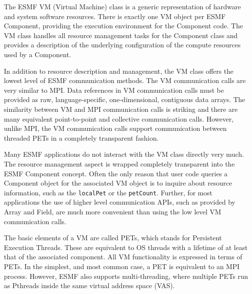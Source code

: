 %

The ESMF VM (Virtual Machine) class is a generic representation of hardware and system software resources. There is exactly one VM object per ESMF Component, providing the execution environment for the Component code. The VM class handles all resource management tasks for the Component class and provides a description of the underlying configuration of the compute resources used by a Component.

In addition to resource description and management, the VM class offers the lowest level of ESMF communication methods. The VM communication calls are very similar to MPI. Data references in VM communication calls must be provided as raw, language-specific, one-dimensional, contiguous data arrays. The similarity between VM and MPI communication calls is striking and there are many equivalent point-to-point and collective communication calls. However, unlike MPI, the VM communication calls support communication between threaded PETs in a completely transparent fashion.

Many ESMF applications do not interact with the VM class directly very much. The  resource management aspect is wrapped completely transparent into the ESMF Component concept. Often the only reason that user code queries a Component
object for the associated VM object is to inquire about resource information, such as the {\tt localPet} or the {\tt petCount}. Further, for most applications the use of higher level communication APIs, such as provided by Array and Field, are much more convenient than using the low level VM communication calls.

The basic elements of a VM are called PETs, which stands for Persistent Execution Threads. These are equivalent to OS threads with a lifetime of at least that of the associated component. All VM functionality is expressed in terms of PETs. In the simplest, and most common case, a PET is equivalent to an MPI process. However, ESMF also supports multi-threading, where multiple PETs run as Pthreads inside the same virtual address space (VAS).

